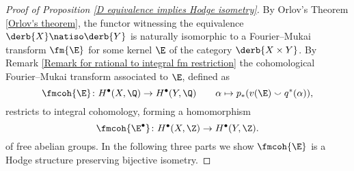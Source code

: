 \begin{proof}[Proof of Proposition \ref{D equivalence implies Hodge isometry}]
    By Orlov's Theorem \ref{Orlov's theorem}, the functor witnessing the equivalence $\derb{X} \natiso \derb{Y}$ is naturally isomorphic to a Fourier--Mukai transform $\fm{\E}$ for some kernel $\E$ of the category $\derb{X \times Y}$. 
    By Remark \ref{Remark for rational to integral fm restriction} the cohomological Fourier--Mukai transform associated to $\E$, defined as
     \[
        \fmcoh{\E} \colon H^\bullet(X, \Q) \to H^\bullet(Y, \Q) \qquad \alpha \mapsto p_*(v(\E) \smallsmile q^*(\alpha)),
    \]
    restricts to integral cohomology, forming a homomorphism
    \[
        \fmcoh{\E^\bullet} \colon H^\bullet(X, \Z) \to H^\bullet(Y, \Z).
    \]
    of free abelian groups. In the following three parts we show $\fmcoh{\E}$ is a Hodge structure preserving bijective isometry.
    

\end{proof}

